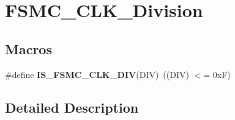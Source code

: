 \hypertarget{group___f_s_m_c___c_l_k___division}{}\section{F\+S\+M\+C\+\_\+\+C\+L\+K\+\_\+\+Division}
\label{group___f_s_m_c___c_l_k___division}
\subsection*{Macros}
\begin{DoxyCompactItemize}
\item 
\hypertarget{group___f_s_m_c___c_l_k___division_ga9e5321b02ea049fd076ba705acd06b5f}{}\#define {\bfseries I\+S\+\_\+\+F\+S\+M\+C\+\_\+\+C\+L\+K\+\_\+\+D\+I\+V}(D\+I\+V)~((D\+I\+V) $<$= 0x\+F)\label{group___f_s_m_c___c_l_k___division_ga9e5321b02ea049fd076ba705acd06b5f}

\end{DoxyCompactItemize}


\subsection{Detailed Description}
